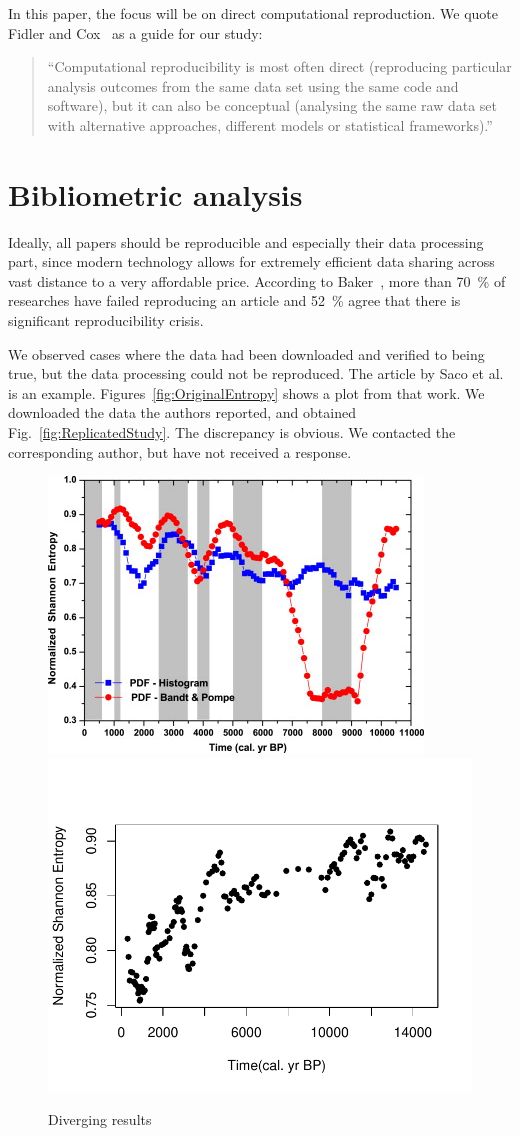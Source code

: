 In this paper, the focus will be on direct computational reproduction.
We quote Fidler and Cox~\cite{Fidler2018} as a guide for our study:
\begin{quote}
``Computational reproducibility is most often direct (reproducing particular analysis outcomes from the same data set using the same code and software), but it can also be conceptual (analysing the same raw data set with alternative approaches, different models or statistical frameworks).''
\end{quote}


\section{Bibliometric analysis}

Ideally, all papers should be reproducible and especially their data processing part, since modern technology allows for extremely efficient data sharing across vast distance to a very affordable price. 
According to Baker~\cite{Baker2016}, more than \SI{70}{\percent} of researches have failed reproducing an article and \SI{52}{\percent} agree that there is significant reproducibility crisis. 

We observed cases where the data had been downloaded and verified to being true, but the data processing could not be reproduced.
The article by Saco et al.~\cite{Saco2010} is an example.
Figures~\ref{fig:OriginalEntropy} shows a plot from that work.
We downloaded the data the authors reported, and obtained Fig.~\ref{fig:ReplicatedStudy}.
The discrepancy is obvious.
We contacted the corresponding author, but have not received a response.

\begin{figure}[hbt]
	\centering
	{\includegraphics[width=.48\textwidth,keepaspectratio]{ElNino/ArticleEntropyPlot.jpg}}
	{\includegraphics[width=.48\textwidth,keepaspectratio]{ElNino/Entropy.pdf}}
	\caption{Diverging results}\label{fig:Diverging}
\end{figure}

